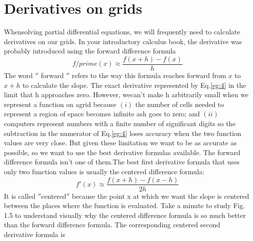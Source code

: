 \documentclass{book}
\theoremstyle{plain}
\theoremstyle{definition}
\numberwithin{exm}{chapter}
\theoremstyle{remark}
\theoremstyle{summary}
\theoremstyle{overview}
\begin{document}
     \section*{Derivatives on grids}
     
	     Whensolving partial differential equations, we will frequently need to calculate derivatives on our grids. In your introductory calculus book, the derivative was probably introduced using the forward difference formula
		\begin{equation} \label{eg:4}
			f/prime(x) \approx \frac{f(x+h) - f(x)}{h}
		\end{equation}		     
     The word 	$''$ forward	$''$  refers to the way this formula reaches forward from $x$ to $x+h$ to calculate the slope. The exact derivative represented by Eq.\eqref{eg:4} in the limit that h approaches zero. However, wecan\rq t make h arbitrarily small when we represent a function on agrid because $(i)$ the number of cells needed to represent a region of space becomes infinite ash goes to zero; and $(ii)$ computers represent numbers with a finite number of significant digits so the subtraction in the numerator of Eq.\eqref{eg:4} loses accuracy when the two function values are very close. But given these limitation we want to be as accurate as possible, so we want to use the best derivative formulas available. The forward difference formula isn’t one of them.The best first derivative formula that uses only two function values is usually the centered difference formula:
     \begin{equation} \label{eq:5}
     	f\prime(x) \approx \frac{f(x+h)-f(x-h)}{2h} 
     \end{equation}
     It is called $''$centered$''$ because the point x at which we want the slope is centered between the places where the function is evaluated. Take a minute to study Fig. 1.5 to understand visually why the centered difference formula is so much better than the forward difference formula. The corresponding centered second derivative formula is
\end{document}
